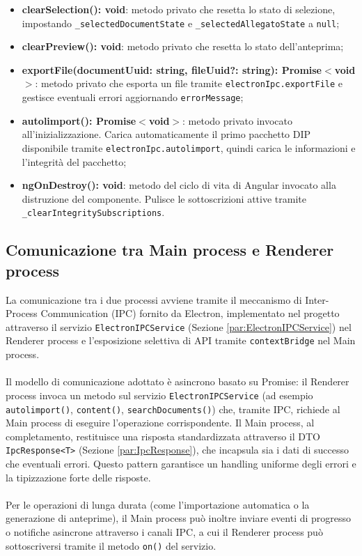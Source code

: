 \documentclass[a4paper,12pt]{article}
\begin{document}
{{{{\begin{itemize}
                    \item \textbf{clearSelection(): void}: metodo privato che resetta lo stato di selezione, impostando \texttt{\_selectedDocumentState} e \texttt{\_selectedAllegatoState} a \texttt{null};
                    \item \textbf{clearPreview(): void}: metodo privato che resetta lo stato dell'anteprima;
                    \item \textbf{exportFile(documentUuid: string, fileUuid?: string): Promise$<$void$>$}: metodo privato che esporta un file tramite \texttt{electronIpc.exportFile} e gestisce eventuali errori aggiornando \texttt{errorMessage};
                    \item \textbf{autolimport(): Promise$<$void$>$}: metodo privato invocato all'inizializzazione. Carica automaticamente il primo pacchetto DIP disponibile tramite \texttt{electronIpc.autolimport}, quindi carica le informazioni e l'integrità del pacchetto;
                    \item \textbf{ngOnDestroy(): void}: metodo del ciclo di vita di Angular invocato alla distruzione del componente. Pulisce le sottoscrizioni attive tramite \texttt{\_clearIntegritySubscriptions}.
                \end{itemize}
            }
        }

        \subsection{Comunicazione tra Main process e Renderer process}\label{sec:ipc-communication} {
            La comunicazione tra i due processi avviene tramite il meccanismo di Inter-Process Communication (IPC) fornito da Electron, implementato nel progetto attraverso il servizio \texttt{ElectronIPCService} (Sezione \ref{par:ElectronIPCService}) nel Renderer process e l'esposizione selettiva di API tramite \texttt{contextBridge} nel Main process.\\
            \\
            Il modello di comunicazione adottato è asincrono basato su Promise: il Renderer process invoca un metodo sul servizio \texttt{ElectronIPCService} (ad esempio \texttt{autolimport()}, \texttt{content()}, \texttt{searchDocuments()}) che, tramite IPC, richiede al Main process di eseguire l'operazione corrispondente. Il Main process, al completamento, restituisce una risposta standardizzata attraverso il DTO \texttt{IpcResponse<T>} (Sezione \ref{par:IpcResponse}), che incapsula sia i dati di successo che eventuali errori. Questo pattern garantisce un handling uniforme degli errori e la tipizzazione forte delle risposte.\\
            \\
            Per le operazioni di lunga durata (come l'importazione automatica o la generazione di anteprime), il Main process può inoltre inviare eventi di progresso o notifiche asincrone attraverso i canali IPC, a cui il Renderer process può sottoscriversi tramite il metodo \texttt{on()} del servizio.
        }

}}
\end{document}
